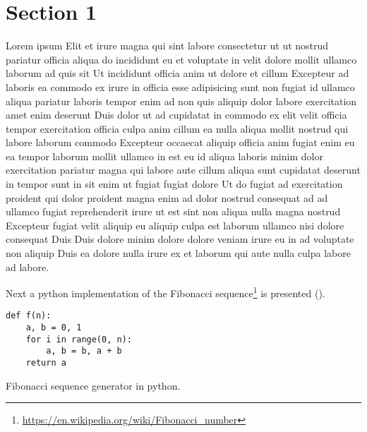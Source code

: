 
\section{Section 1}
\label{sec:section_1}

    Lorem ipsum Elit et irure magna qui sint labore consectetur ut ut nostrud pariatur officia aliqua do incididunt eu et voluptate in velit dolore mollit ullamco laborum ad quis sit Ut incididunt officia anim ut dolore et cillum Excepteur ad laboris ea commodo ex irure in officia esse adipisicing sunt non fugiat id ullamco aliqua pariatur laboris tempor enim ad non quis aliquip dolor labore exercitation amet enim deserunt Duis dolor ut ad cupidatat in commodo ex elit velit officia tempor exercitation officia culpa anim cillum ea nulla aliqua mollit nostrud qui labore laborum commodo Excepteur occaecat aliquip officia anim fugiat enim eu ea tempor laborum mollit ullamco in est eu id aliqua laboris minim dolor exercitation pariatur magna qui labore aute cillum aliqua sunt cupidatat deserunt in tempor sunt in sit enim ut fugiat fugiat dolore Ut do fugiat ad exercitation proident qui dolor proident magna enim ad dolor nostrud consequat ad ad ullamco fugiat reprehenderit irure ut est sint non aliqua nulla magna nostrud Excepteur fugiat velit aliquip eu aliquip culpa est laborum ullamco nisi dolore consequat Duis Duis dolore minim dolore dolore veniam irure eu in ad voluptate non aliquip Duis ea dolore nulla irure ex et laborum qui aute nulla culpa labore ad labore.

    Next a python implementation of the Fibonacci sequence\footnote{\url{https://en.wikipedia.org/wiki/Fibonacci_number}} is presented ().

        \begin{listing}
        \begin{verbatim}
def f(n):
    a, b = 0, 1
    for i in range(0, n):
        a, b = b, a + b
    return a
        \end{verbatim}
        \caption[Fibonacci code example]{Fibonacci sequence generator in python.}
        \label{lst:python_fibonacci}
    \end{listing}
